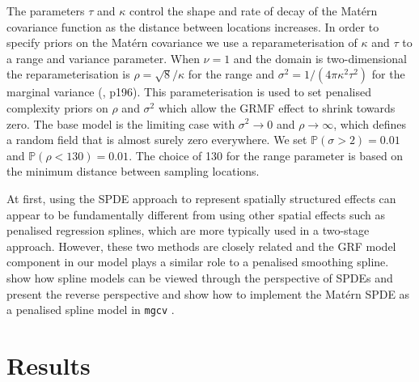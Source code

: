 \documentclass{statsoc}
\begin{document}
The parameters $\tau$ and $\kappa$ control the shape and rate of decay of the Mat\'ern covariance function as the distance between locations increases.  In order to specify priors on the Mat\'ern covariance we use a reparameterisation of $\kappa$ and $\tau$ to a range and variance parameter.  When $\nu = 1$ and the domain is two-dimensional the reparameterisation is $\rho = \sqrt{8} / \kappa$ for the range and $\sigma^2 = 1 / (4\pi\kappa^2\tau^2)$ for the marginal variance (\cite{blangiardo_spatial_2013}, p196).  This parameterisation is used to set penalised complexity priors \citep{simpson_penalising_2017} on $\rho$ and $\sigma^2$ which allow the GRMF effect to shrink towards zero.  The base model is the limiting case with $\sigma^2 \rightarrow 0$ and $\rho \rightarrow \infty$, which defines a random field that is almost surely zero everywhere.  We set $\mathbb{P}(\sigma > 2) = 0.01$ and $\mathbb{P}(\rho < 130) = 0.01$.  The choice of 130 for the range parameter is based on the minimum distance between sampling locations.

At first, using the SPDE approach to represent spatially structured effects can appear to be fundamentally different from using other spatial effects such as penalised regression splines, which are more typically used in a two-stage approach.  However, these two methods are closely related and the GRF model component in our model plays a similar role to a penalised smoothing spline.  \cite{yue_bayesian_2014} show how spline models can be viewed through the perspective of SPDEs and \cite{miller_UnderstandingStochasticPartial_2020} present the reverse perspective and show how to implement the Mat\'ern SPDE as a penalised spline model in \texttt{mgcv} \citep{wood_gam_2017}.

\section{Results}
\label{sec-results}
\end{document}
